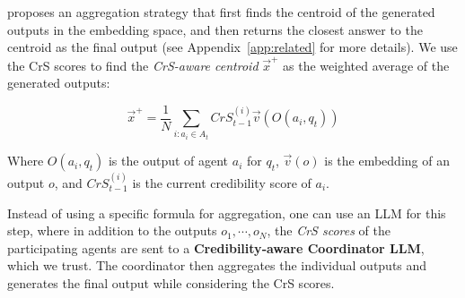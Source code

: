 \vspace{1mm}
 \label{sec:agg-requal}
\cite{requal} proposes an aggregation strategy that first finds the centroid of the generated outputs in the embedding space, and then returns the closest answer to the centroid as the final output (see Appendix~\ref{app:related} for more details).
We use the CrS scores to find the {\em CrS-aware centroid} $\vec{x}^+$ as the weighted average of the generated outputs:

\vspace{-5mm}
\begin{equation}
\vec{x}^{+}=\frac{1}{N} \sum_{i : a_i\in A_t} {CrS}_{t-1}^{(i)} \vec{v}\left( O(a_i,q_t)\right)
\end{equation}

\vspace{-2mm}\noindent 
Where $O(a_i,q_t)$ is the output of agent $a_i$ for $q_t$, $\vec{v}(o)$ is the embedding of an output $o$, and ${CrS}_{t-1}^{(i)}$ is the current credibility score of $a_i$. 

\vspace{1mm}
Instead of using a specific formula for aggregation, one can use an LLM for this step, where in addition to the outputs $o_1,\cdots,o_N$, the {\em CrS scores} of the participating agents are sent to a {\bf Credibility‑aware Coordinator LLM}, which we trust.
The coordinator then aggregates the individual outputs and generates the final output while considering the CrS scores.

